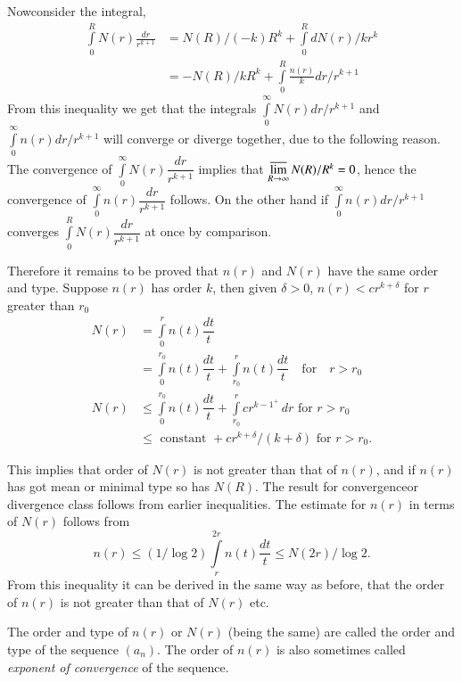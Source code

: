 Now\pageoriginale consider the integral,
\begin{align*}
\int\limits^{R}_{0}N(r) \frac{dr}{r^{k+1}} &=
N(R)/(-k)R^{k}+\int\limits^{R}_{0}dN(r)/kr^{k}\\
&= -N(R)/kR^{k}+\int\limits^{R}_{0}\frac{n(r)}{k}dr/r^{k+1} 
\end{align*}
From this inequality we get that the integrals
$\int\limits^{\infty}_{0}N(r)dr/r^{k+1}$ and\break
$\int\limits^{\infty}_{0}n(r)dr/r^{k+1}$ will converge or diverge
together, due to the following reason. The convergence of
$\int\limits^{\infty}_{0}N(r)\dfrac{dr}{r^{k+1}}$ implies that
$\mathop{\overline{\lim}}\limits_{R\to \infty}N(R)/R^{k}=0$, hence the convergence of
$\int\limits^{\infty}_{0}n(r)\dfrac{dr}{r^{k+1}}$ follows. On the
other hand if $\int\limits^{\infty}_{0}n(r)dr/r^{k+1}$ converges
$\int\limits^{R}_{0}N(r)\dfrac{dr}{r^{k+1}}$ at once by comparison.

Therefore it remains to be proved that $n(r)$ and $N(r)$ have the same
order and type. Suppose $n(r)$ has order $k$, then given $\delta>0$, 
$n(r)<c r^{k+\delta}$ for $r$ greater than $r_{0}$
\begin{align*}
N(r) &= \int\limits^{r}_{0}n(t)\dfrac{dt}{t}\\
&=
\int\limits^{r_{0}}_{0}n(t)\dfrac{dt}{t}+\int\limits^{r}_{r_{0}}n(t)\dfrac{dt}{t}\quad\text{for}\quad
r>r_{0}\\
N(r) &\leq
\int\limits^{r_{0}}_{0}n(t)\dfrac{dt}{t}+\int\limits^{r}_{r_{0}}cr^{k-1^{+}}\,
dr\text{ \  for \ } r>r_{0}\\
&\leq \text{ \ constant \ } +cr^{k+\delta}/(k+\delta)\text{ \  for \ } r>r_{0}.
\end{align*}

This implies that order of $N(r)$ is not greater than that of $n(r)$,
and if $n(r)$ has got mean or minimal type so has $N(R)$. The result
for convergence\pageoriginale or divergence class follows from earlier
inequalities. The estimate for $n(r)$ in terms of $N(r)$ follows from
$$
n(r)\leq (1/\log 2)\int\limits^{2r}_{r}n(t)\dfrac{dt}{t}\leq
N(2r)/\log 2.
$$
From this inequality it can be derived in the same way as before, that
the order of $n(r)$ is not greater than that of $N(r)$ etc.

\begin{defi*}
The order and type of $n(r)$ or $N(r)$ (being the same) are called the
order and type of the sequence $(a_{n})$. The order of $n(r)$ is also
sometimes called {\em exponent of convergence} of the sequence.
\end{defi*}

